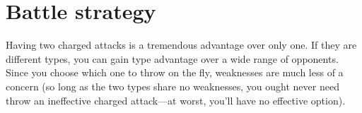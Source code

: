 \chapter{Battle strategy}
\label{chap:strategy}

Having two charged attacks is a tremendous advantage over only one.
If they are different types, you can gain type advantage over a wide
 range of opponents.
Since you choose which one to throw on the fly, weaknesses are
 much less of a concern (so long as the two types share no
 weaknesses, you ought never need throw an ineffective
 charged attack---at worst, you'll have no effective option).

